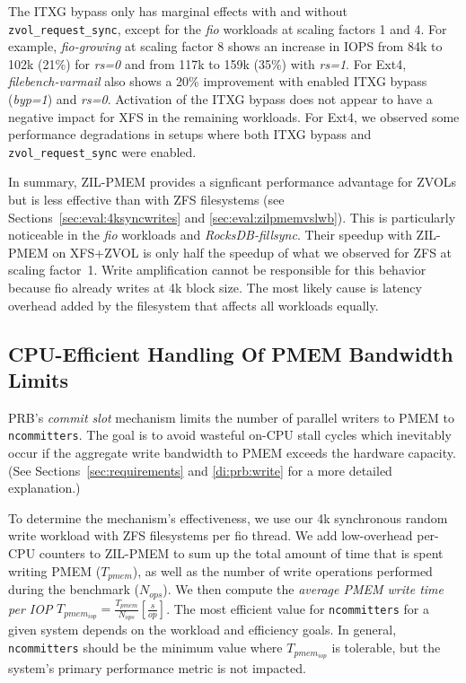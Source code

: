 \documentclass[12pt,a4paper,twoside]{book}
\begin{document}
{The ITXG bypass only has marginal effects with and without \lstinline{zvol_request_sync}, except for the \textit{fio} workloads at scaling factors 1 and 4.
For example, \textit{fio-growing} at scaling factor 8 shows an increase in IOPS from 84k to 102k (21\%) for \textit{rs=0} and from 117k to 159k (35\%) with \textit{rs=1}.
For Ext4, \textit{filebench-varmail} also shows a 20\% improvement with enabled ITXG bypass (\textit{byp=1}) and \textit{rs=0}.
Activation of the ITXG bypass does not appear to have a negative impact for XFS in the remaining workloads.
For Ext4, we observed some performance degradations in setups where both ITXG bypass and \lstinline{zvol_request_sync} were enabled.

In summary, ZIL-PMEM provides a signficant performance advantage for ZVOLs but is less effective than with ZFS filesystems (see Sections~\ref{sec:eval:4ksyncwrites} and \ref{sec:eval:zilpmemvslwb}).
This is particularly noticeable in the \textit{fio} workloads and \textit{RocksDB-fillsync}.
Their speedup with ZIL-PMEM on XFS+ZVOL is only half the speedup of what we observed for ZFS at scaling factor~1.
Write amplification cannot be responsible for this behavior because fio already writes at 4k block size.
The most likely cause is latency overhead added by the filesystem that affects all workloads equally.

\subsection{CPU-Efficient Handling Of PMEM Bandwidth Limits}\label{sec:eval:ncommitters_scalability}

PRB's \textit{commit slot} mechanism limits the number of parallel writers to PMEM to \lstinline{ncommitters}.
The goal is to avoid wasteful on-CPU stall cycles which inevitably occur if the aggregate write bandwidth to PMEM exceeds the hardware capacity.
(See Sections~\ref{sec:requirements} and \ref{di:prb:write} for a more detailed explanation.)

To determine the mechanism's effectiveness, we use our 4k synchronous random write workload with \underline{} ZFS filesystems per fio thread.
We add low-overhead per-CPU counters to ZIL-PMEM to sum up the total amount of time that is spent writing PMEM ($T_{pmem}$), as well as the number of write operations performed during the benchmark ($N_{ops}$).
We then compute the \textit{average PMEM write time per IOP} $T_{pmem_{iop}} = \frac{T_{pmem}}{N_{ops}} [\frac{s}{op}]$.
The most efficient value for \lstinline{ncommitters} for a given system depends on the workload and efficiency goals.
In general, \lstinline{ncommitters} should be the minimum value where $T_{pmem_{iop}}$ is tolerable, but the system's primary performance metric is not impacted.

}
\end{document}
